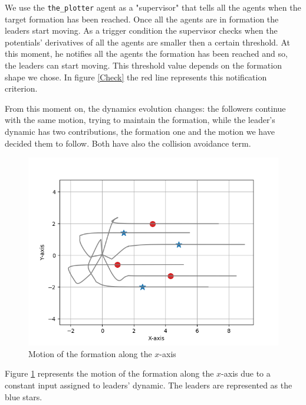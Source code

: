 \documentclass[a4paper,11pt,oneside]{book}
\begin{document}
\bigskip
We use the \texttt{the\_plotter} agent as a "supervisor" that tells all the agents when the target formation has been reached. Once all the agents are in formation the leaders start moving. As a trigger condition the supervisor checks when the potentials' derivatives of all the agents are smaller then a certain threshold. At this moment, he notifies all the agents the formation has been reached and so, the leaders can start moving. This threshold value depends on the formation shape we chose. In figure \ref{Check} the red line represents this notification criterion.

\bigskip
From this moment on, the dynamics evolution changes: the followers continue with the same motion, trying to maintain the formation, while the leader's dynamic has two contributions, the formation one and the motion we have decided them to follow. Both have also the collision avoidance term.

\begin{figure}[h]
\centering
	\includegraphics[scale=0.5]{Moving_hexagon_formation_linear}
	\caption{Motion of the formation along the $x$-axis}
	\label{Formation_motion_lin}
\end{figure}

Figure \ref{Formation_motion_lin} represents the motion of the formation along the $x$-axis due to a constant input assigned to leaders' dynamic. The leaders are represented as the blue stars.
\end{document}
